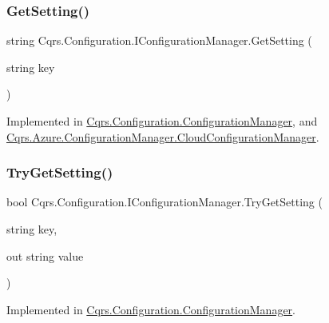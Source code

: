 \subsubsection{\texorpdfstring{Get\+Setting()}{GetSetting()}}
{\footnotesize\ttfamily string Cqrs.\+Configuration.\+I\+Configuration\+Manager.\+Get\+Setting (\begin{DoxyParamCaption}\item[{string}]{key }\end{DoxyParamCaption})}



Implemented in \hyperlink{classCqrs_1_1Configuration_1_1ConfigurationManager_ac3e31af665b95b781fee23f577170a63}{Cqrs.\+Configuration.\+Configuration\+Manager}, and \hyperlink{classCqrs_1_1Azure_1_1ConfigurationManager_1_1CloudConfigurationManager_a48228b7e2204a2449426de32cd6ecc65}{Cqrs.\+Azure.\+Configuration\+Manager.\+Cloud\+Configuration\+Manager}.

\mbox{\label{interfaceCqrs_1_1Configuration_1_1IConfigurationManager_ac4478405e3d9e1c97d14953aea4e695b}} 
\subsubsection{\texorpdfstring{Try\+Get\+Setting()}{TryGetSetting()}\hspace{0.1cm}{\footnotesize\ttfamily [1/2]}}
{\footnotesize\ttfamily bool Cqrs.\+Configuration.\+I\+Configuration\+Manager.\+Try\+Get\+Setting (\begin{DoxyParamCaption}\item[{string}]{key,  }\item[{out string}]{value }\end{DoxyParamCaption})}



Implemented in \hyperlink{classCqrs_1_1Configuration_1_1ConfigurationManager_ad87af2a011af065d6d3e0d2ff01c7f6e}{Cqrs.\+Configuration.\+Configuration\+Manager}.

\mbox{\label{interfaceCqrs_1_1Configuration_1_1IConfigurationManager_a8389181330999fcb8e30af4dbb56d35e}} 
